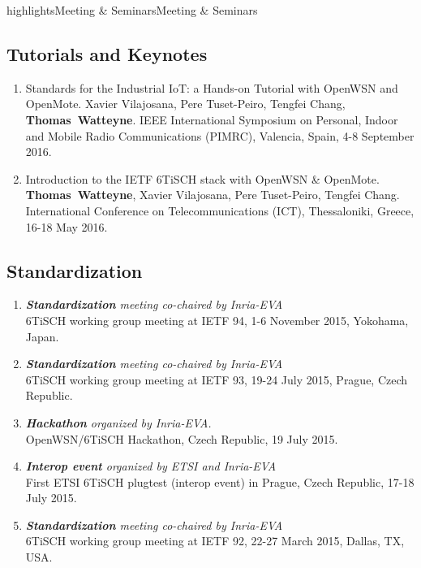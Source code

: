 \documentclass{ra2016}
\newcommand{\thomas}           {\textbf{Thomas~Watteyne}}
\begin{document}
\begin{module}{highlights}{Meeting \& Seminars}{Meeting \& Seminars}
\label{sec:meetingseminars}

\subsection{Tutorials and Keynotes}

\begin{enumerate}
    \item Standards for the Industrial IoT: a Hands-on Tutorial with OpenWSN and OpenMote.
        Xavier Vilajosana, Pere Tuset-Peiro, Tengfei Chang, \thomas. IEEE International Symposium on Personal, Indoor and Mobile Radio Communications (PIMRC), Valencia, Spain, 4-8 September 2016.
    \item Introduction to the IETF 6TiSCH stack with OpenWSN \& OpenMote.
        \thomas, Xavier Vilajosana, Pere Tuset-Peiro, Tengfei Chang. International Conference on Telecommunications (ICT), Thessaloniki, Greece, 16-18 May 2016.
\end{enumerate}

\subsection{Standardization}

\begin{enumerate}
    \item \textit{\textbf{Standardization} meeting co-chaired by Inria-EVA}\\
        6TiSCH working group meeting at IETF 94, 1-6 November 2015, Yokohama, Japan.
    \item \textit{\textbf{Standardization} meeting co-chaired by Inria-EVA}\\
        6TiSCH working group meeting at IETF 93, 19-24 July 2015, Prague, Czech Republic.
    \item \textit{\textbf{Hackathon} organized by Inria-EVA.}\\
        OpenWSN/6TiSCH Hackathon, Czech Republic, 19 July 2015.
    \item \textit{\textbf{Interop event} organized by ETSI and Inria-EVA}\\
        First ETSI 6TiSCH plugtest (interop event) in Prague, Czech Republic, 17-18 July 2015.
    \item \textit{\textbf{Standardization} meeting co-chaired by Inria-EVA}\\
        6TiSCH working group meeting at IETF 92, 22-27 March 2015, Dallas, TX, USA.        
\end{enumerate}


\end{module}
\end{document}
